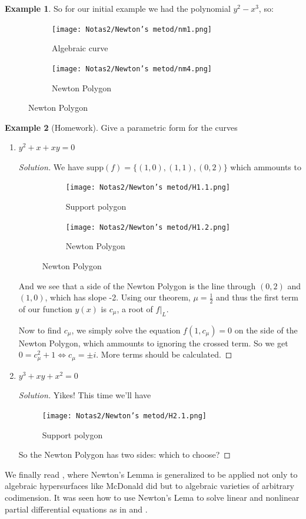 \documentclass{article}
\theoremstyle{definition}
\newtheorem{ex}{Example}
\newcommand{\supp}{\text{supp}}
\begin{document}
\begin{ex}
    So for our initial example we had the polynomial $y^2-x^3$, so:
    	\begin{figure}[H]
		\begin{subfigure}{.4\textwidth}
			\centering
       \texttt{[image: Notas2/Newton's metod/nm1.png]}
			\caption*{Algebraic curve}
		\end{subfigure}
		\begin{subfigure}{.4\textwidth}
			\centering
	\texttt{[image: Notas2/Newton's metod/nm4.png]}
			\caption*{Newton Polygon}
		\end{subfigure}
	\end{figure}
\end{ex}
\begin{ex}[Homework] Give a parametric form for the curves
\begin{enumerate}
    \item $y^2+x+xy=0$
    \begin{proof}[Solution]
        We have $\supp(f)=\{(1,0),(1,1),(0,2)\}$ which ammounts to
        \begin{figure}[H]
		\centering\begin{subfigure}{.3\textwidth}
    \centering
	\texttt{[image: Notas2/Newton's metod/H1.1.png]}
			\caption*{Support polygon}
		\end{subfigure}
		\begin{subfigure}{.4\textwidth}
			\centering
			\texttt{[image: Notas2/Newton's metod/H1.2.png]}
			\caption*{Newton Polygon}
		\end{subfigure}
	\end{figure}
  And we see that a side of the Newton Polygon is the line through $(0,2)$ and $(1,0)$, which has slope -2. Using our theorem, $\mu=\frac{1}{2}$ and thus the first term of our function $y(x)$ is $c_\mu$, a root of $f|_L$.\par
  Now to find $c_\mu$, we simply solve the equation $f(1,c_\mu)=0$ on the side of the Newton Polygon, which ammounts to ignoring the crossed term. So we get $0=c_\mu^2+1\iff c_\mu=\pm i$. More terms should be calculated.
    \end{proof}
    \item $y^3+xy+x^2=0$
    \begin{proof}[Solution]
    Yikes! This time we'll have
    \begin{figure}[H]
    \centering
	\texttt{[image: Notas2/Newton's metod/H2.1.png]}
    \caption*{Support polygon}
    \end{figure}
    So the Newton Polygon has two sides: which to choose?
    \end{proof}
\end{enumerate}
\end{ex}
We finally read \cite{arocailardi}, where Newton's Lemma is generalized to be applied not only to algebraic hypersurfaces like McDonald \cite{grigoriev2015tropical} did but to algebraic varieties of arbitrary codimension. It was seen how to use Newton's Lema to solve linear and nonlinear partial differential equations as in \cite{AROCA2001717} and \cite{Aroca3}.
\end{document}
